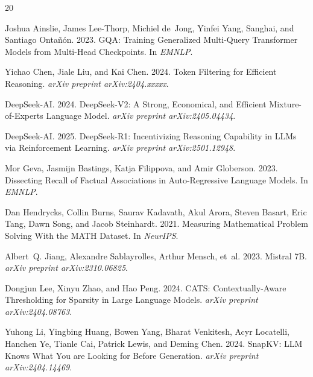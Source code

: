 \documentclass[11pt,a4paper]{article}
\begin{document}
\begin{thebibliography}{20}

Joshua Ainslie, James Lee-Thorp, Michiel de~Jong, Yinfei Yang, Sanghai, and Santiago Onta\~{n}\'{o}n. 2023.
\newblock GQA: Training Generalized Multi-Query Transformer Models from Multi-Head Checkpoints.
\newblock In \emph{EMNLP}.

Yichao Chen, Jiale Liu, and Kai Chen. 2024.
\newblock Token Filtering for Efficient Reasoning.
\newblock \emph{arXiv preprint arXiv:2404.xxxxx}.

DeepSeek-AI. 2024.
\newblock DeepSeek-V2: A Strong, Economical, and Efficient Mixture-of-Experts Language Model.
\newblock \emph{arXiv preprint arXiv:2405.04434}.

DeepSeek-AI. 2025.
\newblock DeepSeek-R1: Incentivizing Reasoning Capability in LLMs via Reinforcement Learning.
\newblock \emph{arXiv preprint arXiv:2501.12948}.

Mor Geva, Jasmijn Bastings, Katja Filippova, and Amir Globerson. 2023.
\newblock Dissecting Recall of Factual Associations in Auto-Regressive Language Models.
\newblock In \emph{EMNLP}.

Dan Hendrycks, Collin Burns, Saurav Kadavath, Akul Arora, Steven Basart, Eric Tang, Dawn Song, and Jacob Steinhardt. 2021.
\newblock Measuring Mathematical Problem Solving With the MATH Dataset.
\newblock In \emph{NeurIPS}.

Albert~Q. Jiang, Alexandre Sablayrolles, Arthur Mensch, et~al. 2023.
\newblock Mistral 7B.
\newblock \emph{arXiv preprint arXiv:2310.06825}.

Dongjun Lee, Xinyu Zhao, and Hao Peng. 2024.
\newblock CATS: Contextually-Aware Thresholding for Sparsity in Large Language Models.
\newblock \emph{arXiv preprint arXiv:2404.08763}.

Yuhong Li, Yingbing Huang, Bowen Yang, Bharat Venkitesh, Acyr Locatelli, Hanchen Ye, Tianle Cai, Patrick Lewis, and Deming Chen. 2024.
\newblock SnapKV: LLM Knows What You are Looking for Before Generation.
\newblock \emph{arXiv preprint arXiv:2404.14469}.


\end{thebibliography}
\end{document}

